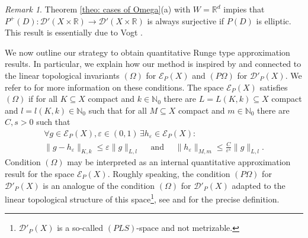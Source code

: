 \documentclass[12pt]{amsart}
\newcommand{\N}{\mathbb{N}}
\newcommand{\R}{\mathbb{R}}
\theoremstyle{definition}
\theoremstyle{remark}
\newtheorem{remark}[theorem]{Remark}
\numberwithin{equation}{section}
\begin{document}
\begin{remark} \label{rem:augmented-elliptic}
	Theorem \ref{theo: cases of Omega}(a) with $W= \R^d$ impies that $P^+(D):\mathscr{D}'(X\times\R)\rightarrow\mathscr{D}'(X\times\R)$ is always surjective if $P(D)$ is elliptic. This result is essentially due to Vogt \cite{Vogt1983}. 
\end{remark}

We now outline our strategy to obtain quantitative Runge type approximation results. In particular, we explain how our method is inspired by and connected to the linear topological invariants $(\Omega)$ for $\mathscr{E}_P(X)$ and  $(P\Omega)$ for $\mathscr{D}'_P(X)$. We refer to \cite{B-D2006,DeKa22,M-V, Kalmes19,Vogt1983} for more information on these conditions. The space $\mathscr{E}_P(X)$ satisfies $(\Omega)$ if for all  $K\subseteq X$ compact and  $k\in\N_0$ there are $L = L(K,k)\subseteq X$ compact and  $l=l(K,k)\in\N_0$ such that for all $M\subseteq X$ compact and  $m\in\N_0$ there are $C,s >0$ such that
\begin{gather}
	\label{def-Omega}
	\forall g\in\mathscr{E}_P(X), \varepsilon\in (0,1) \, \exists h_\varepsilon\in\mathscr{E}_P(X):\\ \nonumber
	\|g-h_\varepsilon\|_{K,k}\leq \varepsilon\|g\|_{L,l} \quad \mbox{ and } \quad \|h_\varepsilon\|_{M,m}\leq\frac{C}{\varepsilon^s}\|g\|_{L,l}.
\end{gather}
Condition $(\Omega)$ may be interpreted as an internal quantitative approximation result for the space $\mathscr{E}_P(X)$. Roughly speaking, the condition $(P\Omega)$ for $\mathscr{D}'_P(X)$ is an analogue of the condition $(\Omega)$ for $\mathscr{D}'_P(X)$ adapted to the linear topological structure of this space\footnote{$\mathscr{D}'_P(X)$ is a so-called  $(PLS)$-space \cite{B-D2006} and not metrizable.}, see \cite[Section 5]{B-D2006}  and \cite{DeKa22} for the precise definition.
\end{document}
